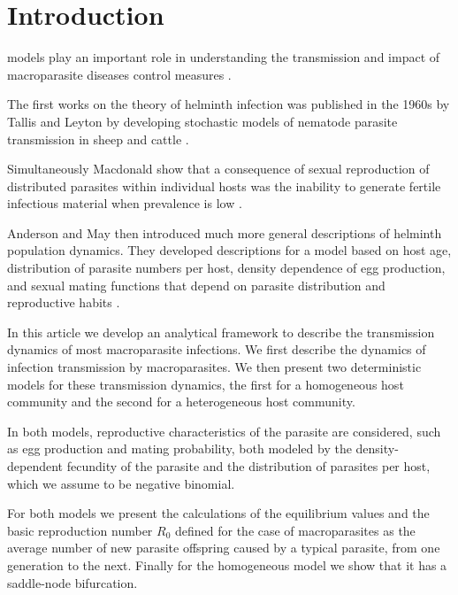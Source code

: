\documentclass[eng]{MMSB-class-eng}
\begin{document}
\newpage
\section{Introduction}
 models play an important role in understanding the transmission and impact of macroparasite diseases control measures \citep{anderson1992infectious,anderson2014coverage,truscott2016soil}.

The first works on the theory of helminth infection was published in the 1960s by Tallis and Leyton by developing stochastic models of nematode parasite transmission in sheep and cattle \citep{leyton1968stochastic,tallis1966stochastic,tallis1969stochastic}.



Simultaneously Macdonald show that a consequence of sexual reproduction of distributed parasites within individual hosts was the inability to generate fertile infectious material when prevalence is low \citep{macdonald1965dynamics}.



Anderson and May then introduced much more general descriptions of helminth population dynamics. They developed descriptions for a model based on host age, distribution of parasite numbers per host, density dependence of egg production, and sexual mating functions that depend on parasite distribution and reproductive habits \citep{anderson1982population,anderson1992infectious}.


In this article we develop an analytical framework to describe the transmission dynamics of most macroparasite infections.
We first describe the dynamics of infection transmission by macroparasites. We then present two deterministic models for these transmission dynamics, the first for a homogeneous host community and the second for a heterogeneous host community.


In both models, reproductive characteristics of the parasite are considered, such as egg production and mating probability, both modeled by the density-dependent fecundity of the parasite and the distribution of parasites per host, which we assume to be negative binomial.	


For both models we present the calculations of the equilibrium values and the basic reproduction number $R_0$ defined for the case of macroparasites as the average number of new parasite offspring caused by a typical parasite, from one generation to the next.
Finally for the homogeneous model we show that it has a saddle-node bifurcation.
\end{document}
